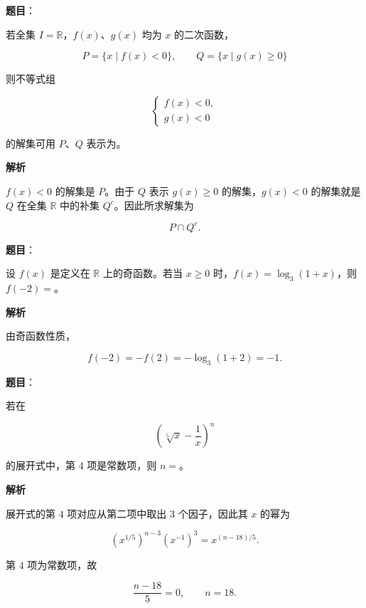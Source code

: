\begin{answer}

\textbf{题目}：

若全集 $I=\mathbb R$，$f(x)\text{、}g(x)$ 均为 $x$ 的二次函数，

\nopagebreak[4]
\[
P=\{x\mid f(x)<0\},\qquad Q=\{x\mid g(x)\ge0\}
\]

则不等式组

\nopagebreak[4]
\[
\begin{cases}
f(x)<0,\\
g(x)<0
\end{cases}
\]

的解集可用 $P\text{、}Q$ 表示为\gkblank{}。

\textbf{解析}

$f(x)<0$ 的解集是 $P$。由于 $Q$ 表示 $g(x)\ge0$ 的解集，$g(x)<0$ 的解集就是 $Q$ 在全集 $\mathbb R$ 中的补集 $Q^c$。因此所求解集为

\nopagebreak[4]
\[
P\cap Q^c.
\]


\end{answer}
\begin{answer}

\textbf{题目}：

设 $f(x)$ 是定义在 $\mathbb R$ 上的奇函数。若当 $x\ge0$ 时，$f(x)=\log_3(1+x)$，则 $f(-2)=$\gkblank{}。

\textbf{解析}

由奇函数性质，

\nopagebreak[4]
\[
f(-2)=-f(2)=-\log_3(1+2)=-1.
\]


\end{answer}
\begin{answer}

\textbf{题目}：

若在

\nopagebreak[4]
\[
\left(\sqrt[5]{x}-\frac1x\right)^n
\]

的展开式中，第 $4$ 项是常数项，则 $n=$\gkblank{}。

\textbf{解析}

展开式的第 $4$ 项对应从第二项中取出 $3$ 个因子，因此其 $x$ 的幂为

\nopagebreak[4]
\[
\left(x^{1/5}\right)^{n-3}\left(x^{-1}\right)^3
=x^{(n-18)/5}.
\]

第 $4$ 项为常数项，故

\nopagebreak[4]
\[
\frac{n-18}{5}=0,
\qquad n=18.
\]


\end{answer}
